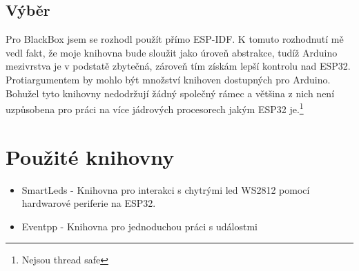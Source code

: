 \subsection{Výběr}

Pro BlackBox jsem se rozhodl použít přímo ESP-IDF.
K tomuto rozhodnutí mě vedl fakt, že moje knihovna bude sloužit jako úroveň abstrakce, tudíž Arduino mezivrstva je v podstatě zbytečná, zároveň tím získám lepší kontrolu nad ESP32.
Protiargumentem by mohlo být množství knihoven dostupných pro Arduino.
Bohužel tyto knihovny nedodržují žádný společný rámec a většina z nich není uzpůsobena pro práci na více jádrových procesorech jakým ESP32 je.\footnote{Nejsou thread safe}

\section{Použité knihovny}

\begin{itemize}
    \item SmartLeds -
        Knihovna pro interakci s chytrými led WS2812 pomocí hardwarové periferie na ESP32.
    \item Eventpp -
        Knihovna pro jednoduchou práci s událostmi
\end{itemize}